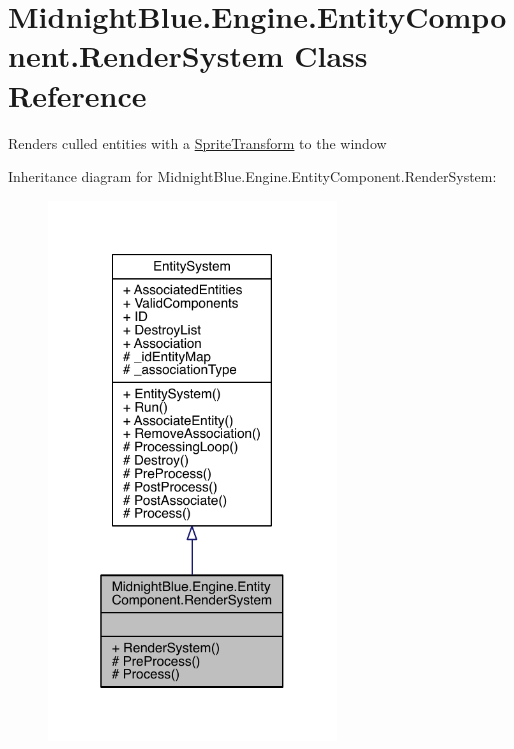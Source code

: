 \hypertarget{class_midnight_blue_1_1_engine_1_1_entity_component_1_1_render_system}{}\section{Midnight\+Blue.\+Engine.\+Entity\+Component.\+Render\+System Class Reference}
\label{class_midnight_blue_1_1_engine_1_1_entity_component_1_1_render_system}


Renders culled entities with a \hyperlink{class_midnight_blue_1_1_engine_1_1_entity_component_1_1_sprite_transform}{Sprite\+Transform} to the window  




Inheritance diagram for Midnight\+Blue.\+Engine.\+Entity\+Component.\+Render\+System\+:
\nopagebreak
\begin{figure}[H]
\begin{center}
\leavevmode
\includegraphics[width=217pt]{class_midnight_blue_1_1_engine_1_1_entity_component_1_1_render_system__inherit__graph}
\end{center}
\end{figure}


